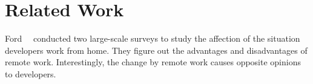 \section{Related Work}
\label{sec:relate}

Ford~\et~\citep{ford2021TOSEM} conducted 
two large-scale surveys to study the affection of 
the situation developers work from home. 
They figure out the advantages and disadvantages of 
remote work. 
Interestingly, the change by remote work causes opposite opinions 
to developers. 

